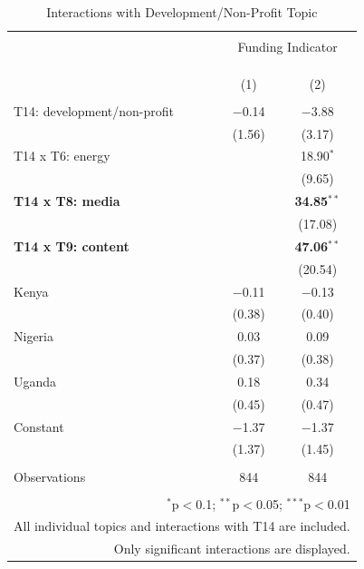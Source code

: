 \documentclass[12pt]{article}
\begin{document}
\begin{table}[!htbp] \centering 
  \caption{Interactions with Development/Non-Profit Topic} 
  \label{} 
\footnotesize 
\begin{tabular}{@{\extracolsep{5pt}}lcc} 
\\[-1.8ex]\hline 
\hline \\[-1.8ex] 
 & \multicolumn{2}{c}{Funding Indicator} \\ 
\cline{2-3} 
\\[-1.8ex] & \multicolumn{2}{c}{} \\ 
\\[-1.8ex] & (1) & (2)\\ 
\hline \\[-1.8ex] 
  T14: development/non-profit & $-$0.14 & $-$3.88 \\ 
  & (1.56) & (3.17) \\ 
  T14 x T6: energy &  & 18.90$^{*}$ \\ 
  &  & (9.65) \\ 
  \textbf{T14 x T8: media} &  & \textbf{34.85}$^{**}$ \\ 
  &  & (17.08) \\ 
   \textbf{T14 x T9: content} &  & \textbf{47.06}$^{**}$ \\ 
  &  & (20.54) \\ 
  Kenya & $-$0.11 & $-$0.13 \\ 
  & (0.38) & (0.40) \\ 
  Nigeria & 0.03 & 0.09 \\ 
  & (0.37) & (0.38) \\ 
  Uganda & 0.18 & 0.34 \\ 
  & (0.45) & (0.47) \\ 
  Constant & $-$1.37 & $-$1.37 \\ 
  & (1.37) & (1.45) \\ 
 \hline \\[-1.8ex] 
Observations & 844 & 844 \\ 
\hline 
\hline \\[-1.8ex] 
 \multicolumn{3}{r}{$^{*}$p$<$0.1; $^{**}$p$<$0.05; $^{***}$p$<$0.01} \\ 
 \multicolumn{3}{r}{ \scriptsize{All individual topics and interactions with T14 are included.}} \\ 
 \multicolumn{3}{r}{\scriptsize{Only significant interactions are displayed.}} \\ 
\end{tabular} 
\end{table} 
\end{document}
